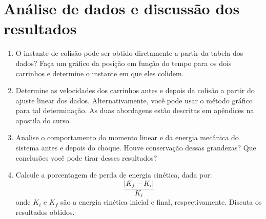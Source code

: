 \section{Análise de dados e discussão dos resultados}
\begin{enumerate}

\item O instante de colisão pode ser obtido diretamente a partir da tabela dos dados?  Faça um gráfico da posição em função do tempo para os dois carrinhos e determine o instante em que eles colidem. 
\item Determine as velocidades dos carrinhos antes e depois da colisão a partir do ajuste linear dos dados. Alternativamente, você pode usar o método gráfico para tal determinação. As duas abordagens estão descritas em apêndices na apostila do curso.
\item Analise o comportamento do momento linear e da energia mecânica do sistema antes e depois do choque. Houve conservação dessas grandezas? Que conclusões você pode tirar desses resultados?

\item Calcule a porcentagem de perda de energia cinética, dada por:
\[
\frac{| K_f - K_i|}{K_i}
\]
\noindent
onde $K_i$ e $K_f$ são a energia cinética inicial e final, respectivamente. Discuta os resultados obtidos.
\end{enumerate}



